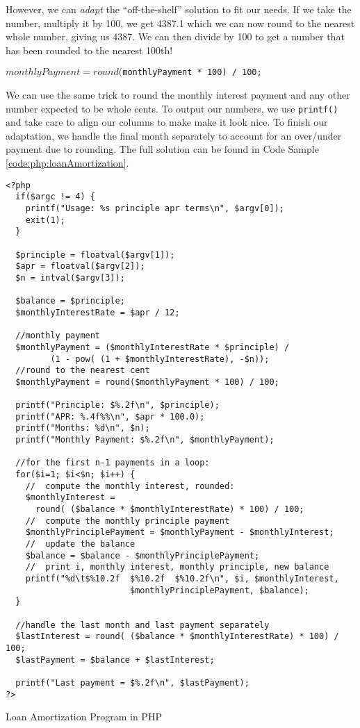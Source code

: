However, we can \emph{adapt} the ``off-the-shelf'' solution to fit our needs.  
If we take the number, multiply it by 100, we get 4387.1 which we can
now round to the nearest whole number, giving us 4387.  We can then 
divide by 100 to get a number that has been rounded to the nearest 100th!

\texttt{$monthlyPayment = round($monthlyPayment * 100) / 100;}

We can use the same trick to round the monthly interest payment and any
other number expected to be whole cents.  To output our numbers, we use
\texttt{printf()} and take care to align our columns to make make it look 
nice.  To finish our adaptation, we handle the final month separately to account
for an over/under payment due to rounding.  The full solution can be found
in Code Sample \ref{code:php:loanAmortization}.

\begin{listing}
\begin{verbatim}
<?php
  if($argc != 4) {
    printf("Usage: %s principle apr terms\n", $argv[0]);
    exit(1);
  }

  $principle = floatval($argv[1]);
  $apr = floatval($argv[2]);
  $n = intval($argv[3]);

  $balance = $principle;
  $monthlyInterestRate = $apr / 12;

  //monthly payment
  $monthlyPayment = ($monthlyInterestRate * $principle) /
         (1 - pow( (1 + $monthlyInterestRate), -$n));
  //round to the nearest cent
  $monthlyPayment = round($monthlyPayment * 100) / 100;

  printf("Principle: $%.2f\n", $principle);
  printf("APR: %.4f%%\n", $apr * 100.0);
  printf("Months: %d\n", $n);
  printf("Monthly Payment: $%.2f\n", $monthlyPayment);

  //for the first n-1 payments in a loop:
  for($i=1; $i<$n; $i++) {
    //  compute the monthly interest, rounded:
    $monthlyInterest =
      round( ($balance * $monthlyInterestRate) * 100) / 100;
    //  compute the monthly principle payment
    $monthlyPrinciplePayment = $monthlyPayment - $monthlyInterest;
    //  update the balance
    $balance = $balance - $monthlyPrinciplePayment;
    //  print i, monthly interest, monthly principle, new balance
    printf("%d\t$%10.2f  $%10.2f  $%10.2f\n", $i, $monthlyInterest,
                         $monthlyPrinciplePayment, $balance);
  }

  //handle the last month and last payment separately
  $lastInterest = round( ($balance * $monthlyInterestRate) * 100) / 100;
  $lastPayment = $balance + $lastInterest;

  printf("Last payment = $%.2f\n", $lastPayment);
?>
\end{verbatim}
\caption{Loan Amortization Program in PHP}
\label{code:php:loanAmortization}
\end{listing}


